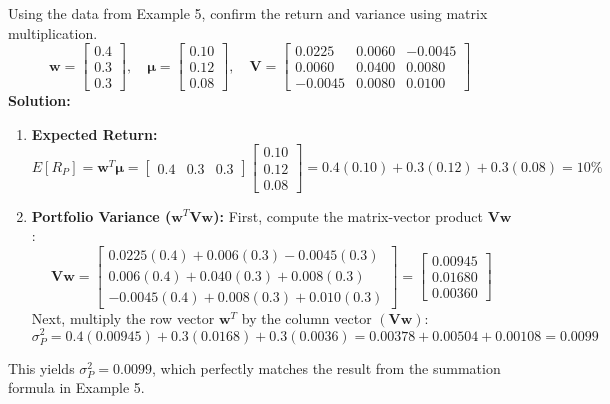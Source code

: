 \begin{tcolorbox}[
	colback=gray!5!white,
	colframe=black!15!white,
	boxrule=0.5pt,
	arc=3pt,
	title=\textbf{Example 7: The Three-Asset Portfolio Revisited (Matrix Form)},
	coltitle=black,
	colbacktitle=black!5!white,
	before skip=6pt,
	after skip=6pt,
	breakable
]
Using the data from Example 5, confirm the return and variance using matrix multiplication.
\[
\mathbf{w} = \begin{bmatrix} 0.4 \\ 0.3 \\ 0.3 \end{bmatrix}, \quad \boldsymbol{\mu} = \begin{bmatrix} 0.10 \\ 0.12 \\ 0.08 \end{bmatrix}, \quad \mathbf{V} = \begin{bmatrix} 0.0225 & 0.0060 & -0.0045 \\ 0.0060 & 0.0400 & 0.0080 \\ -0.0045 & 0.0080 & 0.0100 \end{bmatrix}
\]
\textbf{Solution:}
\begin{enumerate}
	\item \textbf{Expected Return:}
	      \[
	      E[R_P] = \mathbf{w}^T \boldsymbol{\mu} = \begin{bmatrix} 0.4 & 0.3 & 0.3 \end{bmatrix} \begin{bmatrix} 0.10 \\ 0.12 \\ 0.08 \end{bmatrix} = 0.4(0.10) + 0.3(0.12) + 0.3(0.08) = 10\%
	      \]
	\item \textbf{Portfolio Variance ($\mathbf{w}^T \mathbf{V} \mathbf{w}$):}
	      First, compute the matrix-vector product $\mathbf{V}\mathbf{w}$:
	      \[
	      \mathbf{V}\mathbf{w} = \begin{bmatrix}
		      0.0225(0.4) + 0.006(0.3) - 0.0045(0.3) \\
		      0.006(0.4) + 0.040(0.3) + 0.008(0.3) \\
		      -0.0045(0.4) + 0.008(0.3) + 0.010(0.3)
	      \end{bmatrix} = \begin{bmatrix} 0.00945 \\ 0.01680 \\ 0.00360 \end{bmatrix}
	      \]
	      Next, multiply the row vector $\mathbf{w}^T$ by the column vector $(\mathbf{V}\mathbf{w})$:
	      \[
	      \sigma_P^2 = 0.4(0.00945) + 0.3(0.0168) + 0.3(0.0036) = 0.00378 + 0.00504 + 0.00108 = 0.0099
	      \]
\end{enumerate}
This yields $\sigma_P^2 = 0.0099$, which perfectly matches the result from the summation formula in Example 5.
\end{tcolorbox}
